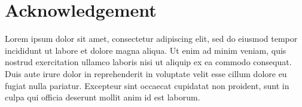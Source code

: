 
\chapter*{Acknowledgement}

Lorem ipsum dolor sit amet, consectetur adipiscing elit, sed do eiusmod tempor incididunt ut labore et dolore magna aliqua. Ut enim ad minim veniam, quis nostrud exercitation ullamco laboris nisi ut aliquip ex ea commodo consequat. Duis aute irure dolor in reprehenderit in voluptate velit esse cillum dolore eu fugiat nulla pariatur. Excepteur sint occaecat cupidatat non proident, sunt in culpa qui officia deserunt mollit anim id est laborum.


